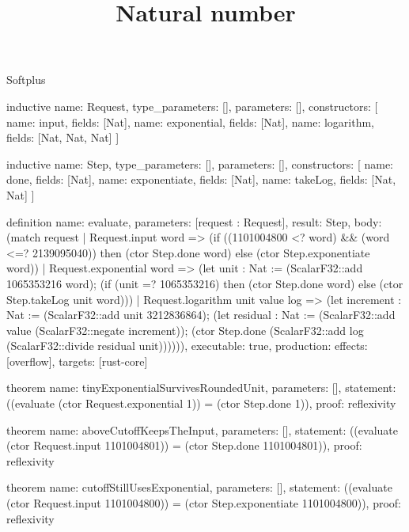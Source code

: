\begin{lexlean}{Softplus}
\title{Natural number}
\begin{semanticmodule}
inductive{
  name: Request,
  type_parameters: [],
  parameters: [],
  constructors: [
    {name: input, fields: [Nat]},
    {name: exponential, fields: [Nat]},
    {name: logarithm, fields: [Nat, Nat, Nat]}
  ]
}

inductive{
  name: Step,
  type_parameters: [],
  parameters: [],
  constructors: [
    {name: done, fields: [Nat]},
    {name: exponentiate, fields: [Nat]},
    {name: takeLog, fields: [Nat, Nat]}
  ]
}

definition{
  name: evaluate,
  parameters: [request : Request],
  result: Step,
  body: (match request
    | Request.input word => (if ((1101004800 <? word) && (word <=? 2139095040)) then (ctor Step.done word) else (ctor Step.exponentiate word))
    | Request.exponential word => (let unit : Nat := (ScalarF32::add 1065353216 word); (if (unit =? 1065353216) then (ctor Step.done word) else (ctor Step.takeLog unit word)))
    | Request.logarithm unit value log => (let increment : Nat := (ScalarF32::add unit 3212836864); (let residual : Nat := (ScalarF32::add value (ScalarF32::negate increment)); (ctor Step.done (ScalarF32::add log (ScalarF32::divide residual unit)))))),
  executable: true,
  production: {effects: [overflow], targets: [rust-core]}
}

theorem{
  name: tinyExponentialSurvivesRoundedUnit,
  parameters: [],
  statement: ((evaluate (ctor Request.exponential 1)) = (ctor Step.done 1)),
  proof: reflexivity{}
}

theorem{
  name: aboveCutoffKeepsTheInput,
  parameters: [],
  statement: ((evaluate (ctor Request.input 1101004801)) = (ctor Step.done 1101004801)),
  proof: reflexivity{}
}

theorem{
  name: cutoffStillUsesExponential,
  parameters: [],
  statement: ((evaluate (ctor Request.input 1101004800)) = (ctor Step.exponentiate 1101004800)),
  proof: reflexivity{}
}
\end{semanticmodule}
\end{lexlean}

